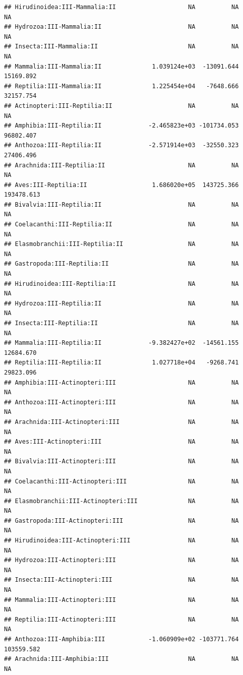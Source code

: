 \documentclass[
  12pt,
]{article}
\begin{document}
\begin{verbatim}
## Hirudinoidea:III-Mammalia:II                    NA          NA          NA
## Hydrozoa:III-Mammalia:II                        NA          NA          NA
## Insecta:III-Mammalia:II                         NA          NA          NA
## Mammalia:III-Mammalia:II              1.039124e+03  -13091.644   15169.892
## Reptilia:III-Mammalia:II              1.225454e+04   -7648.666   32157.754
## Actinopteri:III-Reptilia:II                     NA          NA          NA
## Amphibia:III-Reptilia:II             -2.465823e+03 -101734.053   96802.407
## Anthozoa:III-Reptilia:II             -2.571914e+03  -32550.323   27406.496
## Arachnida:III-Reptilia:II                       NA          NA          NA
## Aves:III-Reptilia:II                  1.686020e+05  143725.366  193478.613
## Bivalvia:III-Reptilia:II                        NA          NA          NA
## Coelacanthi:III-Reptilia:II                     NA          NA          NA
## Elasmobranchii:III-Reptilia:II                  NA          NA          NA
## Gastropoda:III-Reptilia:II                      NA          NA          NA
## Hirudinoidea:III-Reptilia:II                    NA          NA          NA
## Hydrozoa:III-Reptilia:II                        NA          NA          NA
## Insecta:III-Reptilia:II                         NA          NA          NA
## Mammalia:III-Reptilia:II             -9.382427e+02  -14561.155   12684.670
## Reptilia:III-Reptilia:II              1.027718e+04   -9268.741   29823.096
## Amphibia:III-Actinopteri:III                    NA          NA          NA
## Anthozoa:III-Actinopteri:III                    NA          NA          NA
## Arachnida:III-Actinopteri:III                   NA          NA          NA
## Aves:III-Actinopteri:III                        NA          NA          NA
## Bivalvia:III-Actinopteri:III                    NA          NA          NA
## Coelacanthi:III-Actinopteri:III                 NA          NA          NA
## Elasmobranchii:III-Actinopteri:III              NA          NA          NA
## Gastropoda:III-Actinopteri:III                  NA          NA          NA
## Hirudinoidea:III-Actinopteri:III                NA          NA          NA
## Hydrozoa:III-Actinopteri:III                    NA          NA          NA
## Insecta:III-Actinopteri:III                     NA          NA          NA
## Mammalia:III-Actinopteri:III                    NA          NA          NA
## Reptilia:III-Actinopteri:III                    NA          NA          NA
## Anthozoa:III-Amphibia:III            -1.060909e+02 -103771.764  103559.582
## Arachnida:III-Amphibia:III                      NA          NA          NA

\end{verbatim}
\end{document}
